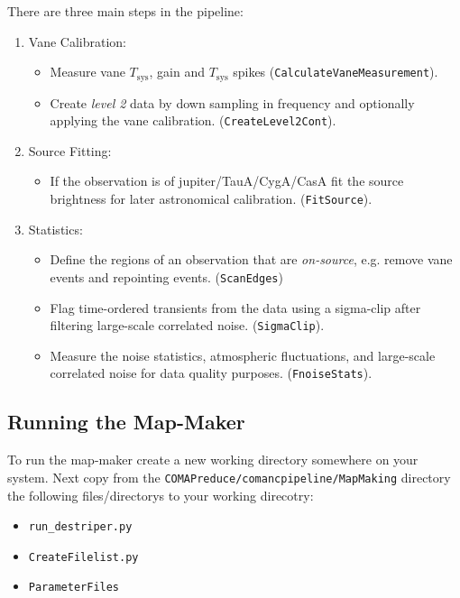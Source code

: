 \documentclass[11pt]{article}
\begin{document}
There are three main steps in the pipeline:
\begin{enumerate}
  \item Vane Calibration: 
    \begin{itemize}
      \item Measure vane $T_\mathrm{sys}$, gain and $T_\mathrm{sys}$ spikes (\texttt{CalculateVaneMeasurement}).
      \item Create \textit{level 2} data by down sampling in frequency and optionally applying the vane calibration. (\texttt{CreateLevel2Cont}).
    \end{itemize}
   \item Source Fitting:
    \begin{itemize}
      \item If the observation is of jupiter/TauA/CygA/CasA fit the source brightness for later astronomical calibration. (\texttt{FitSource}).
    \end{itemize}
   \item Statistics:
     \begin{itemize}
       \item Define the regions of an observation that are \textit{on-source}, e.g. remove vane events and repointing events. (\texttt{ScanEdges})
         \item Flag time-ordered transients from the data using a sigma-clip after filtering large-scale correlated noise. (\texttt{SigmaClip}).
           \item Measure the noise statistics, atmospheric fluctuations, and large-scale correlated noise for data quality purposes. (\texttt{FnoiseStats}).
     \end{itemize}
\end{enumerate}



\subsection{Running the Map-Maker}

To run the map-maker create a new working directory somewhere on your system. Next copy from the \texttt{COMAPreduce/comancpipeline/MapMaking} directory the following files/directorys to your working direcotry:
\begin{itemize}
  \item \texttt{run\_destriper.py}
  \item \texttt{CreateFilelist.py}
  \item \texttt{ParameterFiles}
\end{itemize}
\end{document}
